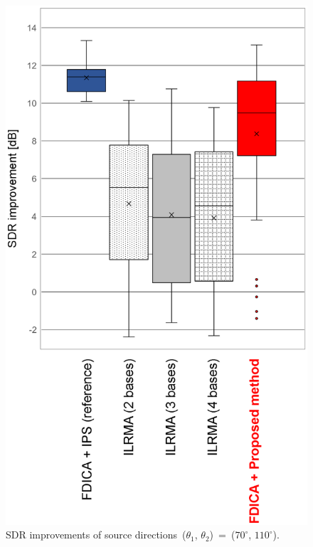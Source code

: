\begin{figure}[th]
    \vspace{4pt}
    \begin{center}
        \includegraphics[width=0.7\columnwidth]{figures/sdr_glaph_070-110.eps}
    \end{center}
    \vspace{-8pt}
	\caption{SDR improvements of source directions~($\theta_1$, $\theta_2$)~=~($70^\circ$, $110^\circ$).}
	\label{fig:070-110}
\end{figure}
